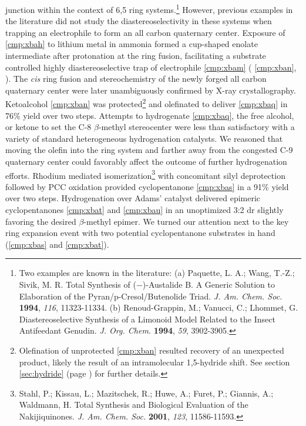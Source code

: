 junction within the context of 6,5 ring systems.\footnote{Two examples are known in the literature:
(a) {\frenchspacing Paquette, L. A.; Wang, T.-Z.; Sivik, M. R. Total Synthesis of ($-$)-Austalide B.
A Generic Solution to Elaboration of the Pyran/p-Cresol/Butenolide Triad. \textit{J. Am. Chem. Soc.}
\textbf{1994}, \textit{116}, 11323-11334.} (b) {\frenchspacing Renoud-Grappin, M.; Vanucci, C.;
Lhommet, G. Diastereoselective Synthesis of a Limonoid Model Related to the Insect Antifeedant
Genudin. \textit{J. Org. Chem.} \textbf{1994}, \textit{59}, 3902-3905.}} However, previous examples
in the literature did not study the diastereoselectivity in these systems when trapping an
electrophile to form an all carbon quaternary center. Exposure of \ref{cmp:xbah} to lithium metal in ammonia formed a cup-shaped enolate intermediate after protonation at the ring fusion, facilitating a substrate controlled highly diastereoselective trap of electrophile \ref{cmp:xbam} (\ce{->} \ref{cmp:xban}, ). The \textit{cis} ring
fusion and stereochemistry of the newly forged all carbon quaternary center were later unambiguously
confirmed by X-ray crystallography.
Ketoalcohol \ref{cmp:xban} was protected\footnote{Olefination of unprotected \ref{cmp:xban} resulted
recovery of an unexpected product, likely the result of an intramolecular 1,5-hydride shift. See
section \ref{sec:hydride} (page \pageref{sec:hydride}) for further details.} and olefinated to
deliver \ref{cmp:xbaq} in 76\% yield over two steps. Attempts to hydrogenate \ref{cmp:xbaq}, the
free alcohol, or ketone to set the C-8 $\beta$-methyl stereocenter were less than satisfactory with
a variety of standard heterogeneous hydrogenation catalysts. We reasoned that moving the olefin into
the ring system and farther away from the congested C-9 quaternary center could favorably affect the
outcome of further hydrogenation efforts. Rhodium mediated isomerization\footnote{{\frenchspacing
Stahl, P.; Kissau, L.; Mazitschek, R.; Huwe, A.; Furet, P.; Giannis, A.; Waldmann, H. Total Synthesis and
Biological Evaluation of the Nakijiquinones. \textit{J. Am. Chem. Soc.} \textbf{2001}, \textit{123},
11586-11593.}} with concomitant silyl deprotection followed by PCC oxidation provided cyclopentanone
\ref{cmp:xbas} in a 91\% yield over two steps.
Hydrogenation over Adams' catalyst delivered epimeric cyclopentanones \ref{cmp:xbat} and
\ref{cmp:xbau} in an unoptimized 3:2 dr slightly favoring the desired $\beta$-methyl epimer. We
turned our attention next to the key ring expansion event with two potential cyclopentanone
substrates in hand (\ref{cmp:xbas} and \ref{cmp:xbat}).

